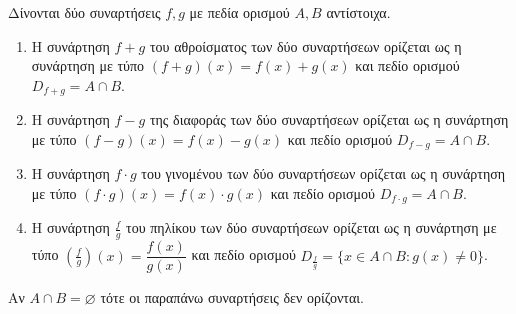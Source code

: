 Δίνονται δύο συναρτήσεις $ f,g $ με πεδία ορισμού $ A,B $ αντίστοιχα. 
\begin{enumerate}
\item Η συνάρτηση $ f+g $ του αθροίσματος των δύο συναρτήσεων ορίζεται ως η συνάρτηση με τύπο $ (f+g)(x)=f(x)+g(x) $ και πεδίο ορισμού $ D_{f+g}=A\cap B $.
\item Η συνάρτηση $ f-g $ της διαφοράς των δύο συναρτήσεων ορίζεται ως η συνάρτηση με τύπο $ (f-g)(x)=f(x)-g(x) $ και πεδίο ορισμού $ D_{f-g}=A\cap B $.
\item Η συνάρτηση $ f\cdot g $ του γινομένου των δύο συναρτήσεων ορίζεται ως η συνάρτηση με τύπο $ (f\cdot g)(x)=f(x)\cdot g(x) $ και πεδίο ορισμού $ D_{f\cdot g}=A\cap B $.
\item Η συνάρτηση $ \frac{f}{g} $ του πηλίκου των δύο συναρτήσεων ορίζεται ως η συνάρτηση με τύπο $ \left(\frac{f}{g}\right)(x)=\dfrac{f(x)}{g(x)} $ και πεδίο ορισμού $ D_{\frac{f}{g}}=\{x\in A\cap B:g(x)\neq 0\} $.
\end{enumerate}
Αν $ A\cap B=\varnothing $ τότε οι παραπάνω συναρτήσεις δεν ορίζονται.

